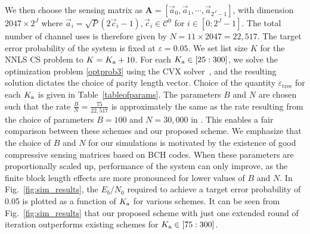 \documentclass{article}
\begin{document}
We then choose the sensing matrix as $\mathbf{A} = [\vec{a}_0, \vec{a}_1, \cdots, \vec{a}_{2^J-1}]$, with dimension $2047 \times 2^J$ where $\vec{a}_i=\sqrt{P}(2\vec{c}_i-1), \vec{c}_i \in \mathcal{C}^0$ for $i \in [0:2^J-1]$. The total number of channel uses is therefore given by $N=11\times2047=22,517$. The target error probability of the system is fixed at $\varepsilon=0.05$. We set list size $K$ for the NNLS CS problem to $K=K_\mathrm{a}+10$. For each $K_\mathrm{a} \in [25:300]$, we solve the optimization problem \eqref{optprob3} using the CVX solver~\cite{grant2008cvx}, and the resulting solution dictates the choice of parity length vector.
Choice of the quantity $\varepsilon_{\mathrm{tree}}$ for each $K_\mathrm{a}$ is given in Table~\ref{tableofparams}.
The parameters $B$ and $N$ are chosen such that the rate $\frac{B}{N}=\frac{75}{22,517}$ is approximately the same as the rate resulting from the choice of parameters $B=100$ and $N=30,000$ in \cite{ordentlich2017low,vem2017user}.
This enables a fair comparison between these schemes and our proposed scheme.
We emphasize that the choice of $B$ and $N$ for our simulations is motivated by the existence of good compressive sensing matrices based on BCH codes.
When these parameters are proportionally scaled up, performance of the system can only improve, as the finite block length effects are more pronounced for lower values of $B$ and $N$.
In Fig.~\ref{fig:sim_results}, the $E_b/N_0$ required to achieve a target error probability of 0.05 is plotted as a function of $K_\mathrm{a}$ for various schemes.
%
It can be seen from Fig.~\ref{fig:sim_results} that our proposed scheme with just one extended round of iteration outperforms existing schemes for $K_\mathrm{a} \in [75:300]$. 



\end{document}
